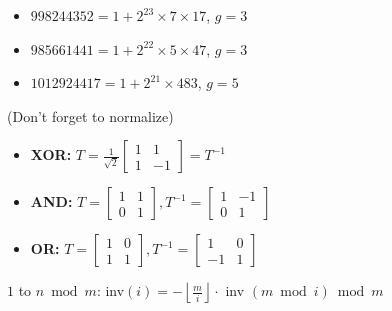 \begin{itemize}
\item $998244352 = 1 + 2^{23} \times 7 \times 17$, $g = 3$
\item $985661441 = 1 + 2^{22} \times 5 \times 47$, $g = 3$
\item $1012924417 = 1 + 2^{21} \times 483$, $g = 5$
\end{itemize}

 (Don't forget to normalize)
\begin{itemize}
  \item \textbf{XOR:} $T = \frac{1}{\sqrt{2}}\begin{bmatrix} 1 & 1 \\ 1 & -1 \end{bmatrix} = T^{-1}$
  \item \textbf{AND:} $T = \begin{bmatrix} 1 & 1 \\ 0 & 1 \end{bmatrix}, T^{-1} = \begin{bmatrix} 1 & -1 \\ 0 & 1 \end{bmatrix}$
  \item \textbf{OR:} $T = \begin{bmatrix} 1 & 0 \\ 1 & 1 \end{bmatrix}, T^{-1} = \begin{bmatrix} 1 & 0 \\ -1 & 1 \end{bmatrix}$
\end{itemize}

 $1$ to $n \bmod m$: inv$(i) = - \left\lfloor \frac{m}{i} \right\rfloor \cdot$ inv $(m \bmod i) \bmod m$

